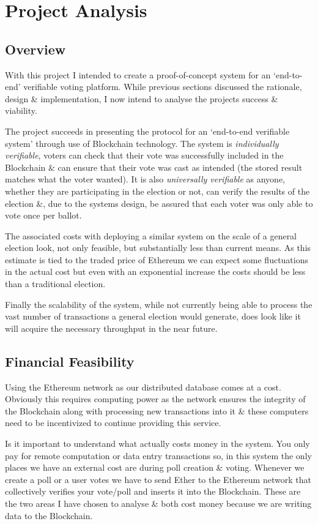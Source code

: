 \documentclass{article}
\begin{document}
    \section{Project Analysis}
    \subsection{Overview}
	With this project I intended to create a proof-of-concept system for an `end-to-end' verifiable voting platform. While previous sections discussed the rationale, design \& implementation, I now intend to analyse the projects success \& viability.

	The project succeeds in presenting the protocol for an `end-to-end verifiable system' through use of Blockchain technology. The system is \textit{individually verifiable}, voters can check that their vote was successfully included in the Blockchain \& can ensure that their vote was cast as intended (the stored result matches what the voter wanted). It is also \textit{universally verifiable} as anyone, whether they are participating in the election or not, can verify the results of the election \&, due to the systems design, be assured that each voter was only able to vote once per ballot.
	
	The associated costs with deploying a similar system on the scale of a general election look, not only feasible, but substantially less than current means. As this estimate is tied to the traded price of Ethereum we can expect some fluctuations in the actual cost but even with an exponential increase the costs should be less than a traditional election.
	
	Finally the scalability of the system, while not currently being able to process the vast number of transactions a general election would generate, does look like it will acquire the necessary throughput in the near future.
	
    \cleardoublepage
    \subsection{Financial Feasibility}
	Using the Ethereum network as our distributed database comes at a cost. Obviously this requires computing power as the network ensures the integrity of the Blockchain along with processing new transactions into it \& these computers need to be incentivized to continue providing this service.
	
	Is it important to understand what actually costs money in the system. You only pay for remote computation or data entry transactions so, in this system the only places we have an external cost are during poll creation \& voting. Whenever we create a poll or a user votes we have to send Ether to the Ethereum network that collectively verifies your vote/poll and inserts it into the Blockchain. These are the two areas I have chosen to analyse \& both cost money because we are writing data to the Blockchain.
	
\end{document}
